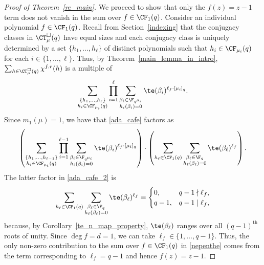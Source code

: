 \begin{proof}[Proof of Theorem~\ref{re_main}]
We proceed to show that only the \(f(z) = z-1\) term does not vanish in the sum over \(f \in \CF_1(q)\).
Consider an individual polynomial \(f \in \CF_1 (q)\).
Recall from Section~\ref{indexing} that the conjugacy classes in \(\CT_\mu^\Box (q)\) have equal sizes and each conjugacy class is uniquely determined by a set \(\{h_1,\ldots,h_\ell\}\) of distinct polynomials such that \(h_i \in \CF_{\mu_i} (q)\) for each \(i \in \{1,\ldots,\ell\}\).
Thus,
by Theorem~\ref{main_lemma_in_intro},
\(\sum_{h \in \CT_\mu^\Box (q)} \chi^{f,r} (h)\) is a multiple of
\begin{equation}
\label{ada_cafe}
\sum_{\substack{\{h_1,\ldots,h_\ell\} \\ h_i \in \CF_{\mu_i} (q)}}
\prod_{i=1}^\ell
\sum_{\substack{\beta_i \in \F_{q^{\mu_i}} \\ h_i(\beta_i) = 0}} \te(\beta_i)^{\ell_f \cdot [\mu_i]_q}.
\end{equation}
Since \(m_1(\mu) = 1\), we have that \eqref{ada_cafe} factors as
\begin{equation}
\label{ada_cafe_2}
\left (
\sum_{\substack{\{h_1,\ldots,h_{\ell-1}\} \\ h_i \in \CF_{\mu_i} (q)}}
\prod_{i=1}^{\ell-1}
\sum_{\substack{\beta_i \in \F_{q^{\mu_i}} \\ h_i(\beta_i) = 0}} \te(\beta_i)^{\ell_f \cdot [\mu_i]_q}
\right )
\cdot
\left (
\sum_{h_\ell \in \CF_{1} (q)}
\sum_{\substack{\beta_\ell \in \F_{q} \\ h_\ell(\beta_\ell) = 0}} \te(\beta_\ell)^{\ell_f}
\right ).
\end{equation}
The latter factor in \eqref{ada_cafe_2} is
\[
\sum_{h_\ell \in \CF_1 (q)} \sum_{\substack{\beta_\ell \in \F_q \\ h_\ell(\beta_\ell) = 0}} \te(\beta_\ell)^{\ell_f}
=
\begin{cases}
0, & q-1 \nmid \ell_f, \\
q-1, & q-1 \mid \ell_f,
\end{cases}
\]
because, by Corollary~\ref{te_n_map_property}, \(\te(\beta_\ell)\) ranges over all \((q-1)^\text{th}\) roots of unity.
Since \(\deg f = d = 1\), we can take \(\ell_f \in \{1,\ldots,q-1\}\).
Thus, the only non-zero contribution to the sum over \(f \in \CF_1(q)\) in \eqref{nepenthe} comes from the term corresponding to \(\ell_f = q-1\) and hence \(f(z) = z-1\).


\end{proof}

